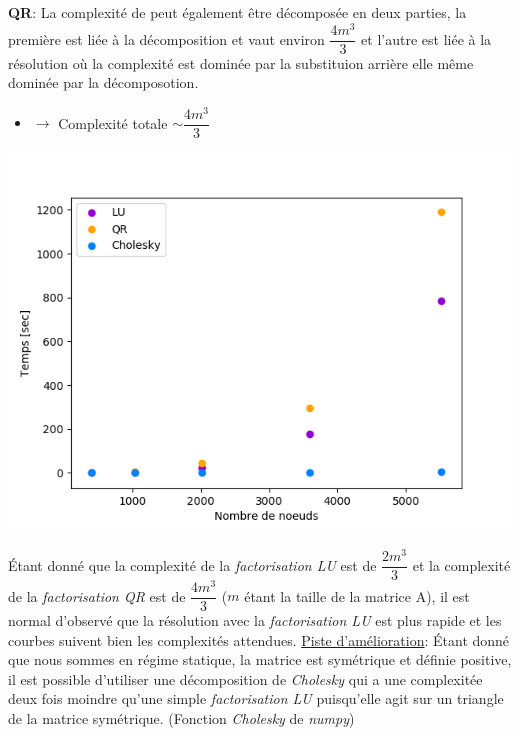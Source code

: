 \documentclass{article}[11pt]
\begin{document}
\noindent
\textbf{QR}: La complexité de  peut également être décomposée en deux parties, la première est liée à la décomposition et vaut environ $\dfrac{4m^3}{3}$ et l'autre est liée à la résolution où la complexité est dominée par la substituion arrière elle même dominée par la décomposotion.
\begin{itemize}
    \item[] $\rightarrow$ Complexité totale $\sim \dfrac{4m^3}{3}$
\end{itemize}

\noindent\begin{minipage}{0.5\textwidth}
\includegraphics[width=\textwidth]{./res/plots/complexite.png}
\end{minipage}%
\begin{minipage}{0.5\textwidth}
Étant donné que la complexité de la \textit{factorisation LU} est de $\dfrac{2m^3}{3}$ et la complexité de la \textit{factorisation QR} est de $\dfrac{4m^3}{3}$ ($m$ étant la taille de la matrice A), il est normal d'observé que la résolution avec la \textit{factorisation LU} est plus rapide et les courbes suivent bien les complexités attendues.
\underline{Piste d'amélioration}: Étant donné que nous sommes en régime statique, la matrice  est symétrique et définie positive, il est possible d'utiliser une décomposition de \textit{Cholesky} qui a une complexitée deux fois moindre qu'une simple \textit{factorisation LU} puisqu'elle agit sur un triangle de la matrice symétrique. (Fonction \textit{Cholesky} de \textit{numpy})
\end{minipage}
\end{document}
